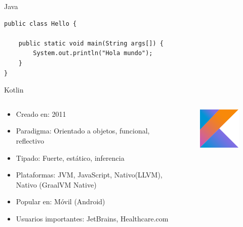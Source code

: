 \documentclass[aspectratio=169]{beamer}
\begin{document}
\begin{frame}[fragile]{Java}
\begin{lstlisting}
public class Hello {

    public static void main(String args[]) {
        System.out.println("Hola mundo");
    }
}
\end{lstlisting}
\end{frame}


\begin{frame}{Kotlin}
	\begin{columns}[T] %
		\begin{column}[T]{0.5\textwidth} %
			\begin{itemize}
				\item Creado en: 2011
				\item Paradigma: Orientado a objetos, funcional, reflectivo
				\item Tipado: Fuerte, estático, inferencia
				\item Plataformas: JVM, JavaScript, Nativo(LLVM), Nativo (GraalVM Native)
				\item Popular en: Móvil (Android)
				\item Usuarios importantes: JetBrains, Healthcare.com
			\end{itemize}
		\end{column}
		\begin{column}[T]{7cm} %
			\begin{figure}
				\centering
				\includegraphics[width=0.5\linewidth]{Images/kotlin}
			\end{figure}
			
		\end{column}
	\end{columns}
\end{frame}
\end{document}
